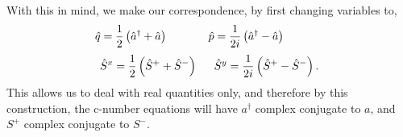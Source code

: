\documentclass[aps,prl,twocolumn,
superscriptaddress,groupedaddress]{revtex4}
\begin{document}
With this in mind, we make our correspondence, by first changing
variables to,
\begin{equation}
\hspace{-0.5in} \hat{q} =
\frac{1}{2} \left( \hat{a}^{\dagger} + \hat{a} \right)
\hspace{0.5in} \hat{p} =
\frac{1}{2i} \left( \hat{a}^{\dagger} - \hat{a} \right)
\end{equation}
\begin{equation}
\hat{S}^x =
\frac{1}{2} \left( \hat{S}^{+} + \hat{S}^{-} \right)
\hspace{0.2in} \hat{S}^y =
\frac{1}{2i} \left( \hat{S}^{+} - \hat{S}^{-} \right).
\end{equation}
This allows us to deal with real quantities only, and therefore by this
construction, the c-number equations will have $a^{\dagger}$ complex
conjugate to $a$, and $S^+$  complex conjugate to $S^-$.
\end{document}

